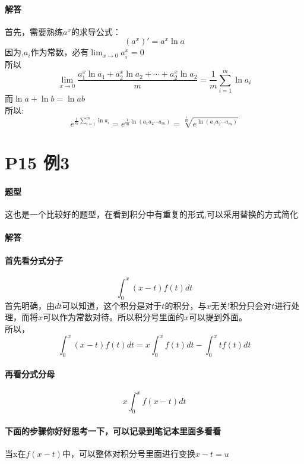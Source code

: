 \documentclass[a4paper]{ctexart}
\begin{document}
\begin{multicols}{2}
\paragraph{解答}
首先，需要熟练$a^x$的求导公式：
$$
(a^x)' = a^x\ln{a}
$$
因为,$a_i$作为常数，必有$\lim_{x \rightarrow 0}{a_i^x=0}$\\
所以\\
$$
\lim_{x \rightarrow 0}
    {
        \frac{
            a_1^x\ln{a_1} +a_2^x\ln{a_2} +\cdots  + a_2^x\ln{a_2}   
         }
         {m}
    }
    =
    \frac{1}{m}
    \sum_{i=1}^{m}{\ln{a_i}}
$$
而$\ln{a} + \ln{b} = \ln{ab}$\\
所以:
$$
e^{
    \frac{1}{m}
    \sum_{i = 1}^{m}{\ln{a_i}}
    }
    =
    e^{
        \frac{1}{m}
        \ln{(a_1 a_2 \cdots a_m)}
    }
    =
    \sqrt[\frac{1}{m}]{e^{\ln{(a_1 a_2 \cdots a_m)}}}
$$

\section{P15 例3}
\paragraph{题型}
这也是一个比较好的题型，在看到积分中有重复的形式,可以采用替换的方式简化\\

\paragraph{解答}
\paragraph{首先看分式分子}
$$
\int_{0}^{x}{(x-t)f(t)dt}
$$
首先明确，由$dt$可以知道，这个积分是对于$t$的积分，与$x$无关!积分只会对$t$进行处理，而将$x$可以作为常数对待。所以积分号里面的$x$可以提到外面。\\
所以，
$$
\int_{0}^{x}{(x-t)f(t)dt}
=
x\int_{0}^{x}{f(t)dt}
-
\int_{0}^{x}{tf(t)dt}
$$
\paragraph{再看分式分母}
$$
x\int_{0}^{x}{f(x-t)dt}
$$
\paragraph{下面的步骤你好好思考一下，可以记录到笔记本里面多看看}
当x在$f(x-t)$中，可以整体对积分号里面进行变换$x-t=u$\\

\end{multicols}
\end{document}
